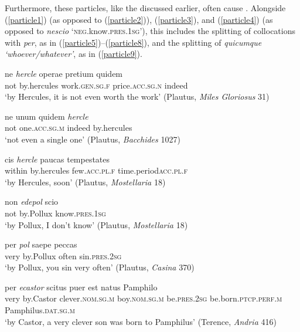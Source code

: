 Furthermore, these particles, like the  discussed earlier, often cause . Alongside (\ref{particle1}) (as opposed to (\ref{particle2})), (\ref{particle3}), and (\ref{particle4}) (as opposed to \emph{nescio} `\textsc{neg}.know.\textsc{pres.1sg}'), this includes the splitting of collocations with \emph{per}, as in (\ref{particle5})--(\ref{particle8}), and the splitting of \emph{quicumque `whoever/whatever'}, as in (\ref{particle9}).

\begin{exe}
\ex
\gll ne \emph{hercle} operae pretium quidem\\
not by.hercules work.\textsc{gen.sg.f} price.\textsc{acc.sg.n} indeed\\
\trans `by Hercules, it is not even worth the work' (Plautus, \textit{Miles Gloriosus} 31) 
\label{particle1}
\end{exe}

\begin{exe}
\ex
\gll ne unum quidem \emph{hercle}\\
not one.\textsc{acc.sg.m} indeed by.hercules\\
\trans `not even a single one' (Plautus, \textit{Bacchides} 1027) 
\label{particle2}
\end{exe}

\begin{exe}
\ex
\gll cis \emph{hercle} paucas tempestates\\
within by.hercules few.\textsc{acc.pl.f} time.period\textsc{acc.pl.f}\\
\trans `by Hercules, soon' (Plautus, \textit{Mostellaria} 18) 
\label{particle3}
\end{exe}

\begin{exe}
\ex
\gll non \emph{edepol} scio\\
not by.Pollux know.\textsc{pres.1sg}\\
\trans `by Pollux, I don't know' (Plautus, \textit{Mostellaria} 18)
\label{particle4}
\end{exe}

\begin{exe}
\ex
\gll per \emph{pol} saepe peccas\\
very by.Pollux often sin.\textsc{pres.2sg}\\
\trans `by Pollux, you sin very often' (Plautus, \textit{Casina} 370) 
\label{particle5}
\end{exe}

\begin{exe}
\ex
\gll per \emph{ecastor} scitus puer est natus Pamphilo\\
very by.Castor clever.\textsc{nom.sg.m} boy.\textsc{nom.sg.m} be.\textsc{pres.2sg} be.born.\textsc{ptcp.perf.m} Pamphilus.\textsc{dat.sg.m}\\
\trans `by Castor, a very clever son was born to Pamphilus' (Terence, \textit{Andria} 416) 
\label{particle6}
\end{exe}

